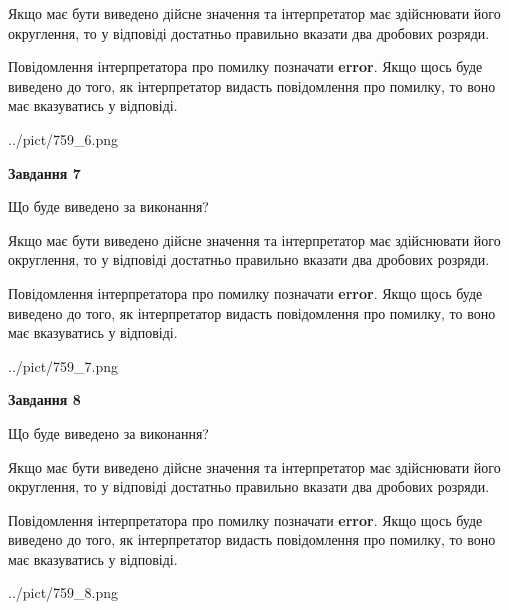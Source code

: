 \documentclass[12pt, ukrainian]{article}
\begin{document}
{\begin {Large}
Якщо має бути виведено дійсне значення та інтерпретатор має здійснювати його округлення, 
то у відповіді достатньо правильно вказати два дробових розряди.

Повідомлення інтерпретатора про помилку позначати \textbf{error}.
Якщо щось буде виведено до того, як інтерпретатор видасть повідомлення про помилку, 
то воно має вказуватись у відповіді. \par

\begin{center}
	{../pict/759_6.png}
\end{center}
\newpage

{\begin {center}\textbf{Завдання 7}\end {center}}\par
Що буде виведено за виконання? \par

Якщо має бути виведено дійсне значення та інтерпретатор має здійснювати його округлення, 
то у відповіді достатньо правильно вказати два дробових розряди.

Повідомлення інтерпретатора про помилку позначати \textbf{error}.
Якщо щось буде виведено до того, як інтерпретатор видасть повідомлення про помилку, 
то воно має вказуватись у відповіді. \par

\begin{center}
	{../pict/759_7.png}
\end{center}
\newpage

{\begin {center}\textbf{Завдання 8}\end {center}}\par
Що буде виведено за виконання? \par

Якщо має бути виведено дійсне значення та інтерпретатор має здійснювати його округлення, 
то у відповіді достатньо правильно вказати два дробових розряди.

Повідомлення інтерпретатора про помилку позначати \textbf{error}.
Якщо щось буде виведено до того, як інтерпретатор видасть повідомлення про помилку, 
то воно має вказуватись у відповіді. \par

\begin{center}
	{../pict/759_8.png}
\end{center}
\newpage


\end{Large}}
\end{document}
